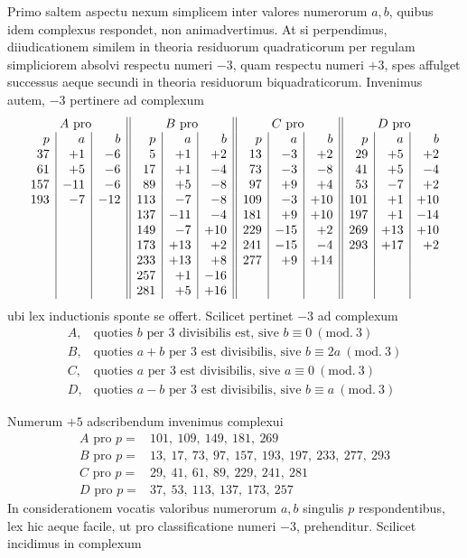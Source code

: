 %
Primo saltem aspectu nexum simplicem inter valores numerorum $a,b$, quibus idem complexus respondet, non animadvertimus. At si perpendimus, diiudicationem similem in theoria residuorum quadraticorum per regulam simpliciorem absolvi respectu numeri $-3$, quam respectu numeri $+3$, spes affulget successus aeque secundi in theoria residuorum biquadraticorum. Invenimus autem, $-3$ pertinere ad complexum
\[
\begin{array}{r|r|r||r|r|r||r|r|r||r|r|r}
\multicolumn{3}{c||}{A\ \text{pro}}&\multicolumn{3}{c||}{B\ \text{pro}}&\multicolumn{3}{c||}{C\ \text{pro}}&\multicolumn{3}{c}{D\ \text{pro}}\\
p&a&b&p&a&b&p&a&b&p&a&b\\
37&+1&-6&5&+1&+2&13&-3&+2&29&+5&+2\\
61&+5&-6&17&+1&-4&73&-3&-8&41&+5&-4\\
157&-11&-6&89&+5&-8&97&+9&+4&53&-7&+2\\
193&-7&-12&113&-7&-8&109&-3&+10&101&+1&+10\\
&&&137&-11&-4&181&+9&+10&197&+1&-14\\
&&&149&-7&+10&229&-15&+2&269&+13&+10\\
&&&173&+13&+2&241&-15&-4&293&+17&+2\\
&&&233&+13&+8&277&+9&+14&&&\\
&&&257&+1&-16&&&&&&\\
&&&281&+5&+16&&&&&&
\end{array}
\]
ubi lex inductionis sponte se offert. Scilicet pertinet $-3$ ad complexum
\[
\begin{array}{ll}
A,&\text{quoties }b\text{ per }3\text{ divisibilis est, sive }b\equiv0\ (\mathrm{mod.}\ 3)\\
B,&\text{quoties }a+b\text{ per }3\text{ est divisibilis, sive }b\equiv2a\ (\mathrm{mod.}\ 3)\\
C,&\text{quoties }a\text{ per }3\text{ est divisibilis, sive }a\equiv0\ (\mathrm{mod.}\ 3)\\
D,&\text{quoties }a-b\text{ per }3\text{ est divisibilis, sive }b\equiv a\ (\mathrm{mod.}\ 3)
\end{array}
\]

Numerum $+5$ adscribendum invenimus complexui
\[
\begin{array}{ll}
A\text{ pro }p=&101,\ 109,\ 149,\ 181,\ 269\\
B\text{ pro }p=&13,\ 17,\ 73,\ 97,\ 157,\ 193,\ 197,\ 233,\ 277,\ 293\\
C\text{ pro }p=&29,\ 41,\ 61,\ 89,\ 229,\ 241,\ 281\\
D\text{ pro }p=&37,\ 53,\ 113,\ 137,\ 173,\ 257
\end{array}
\]
In considerationem vocatis valoribus numerorum $a,b$ singulis $p$ respondentibus, lex hic aeque facile, ut pro classificatione numeri $-3$, prehenditur. Scilicet incidimus in complexum

